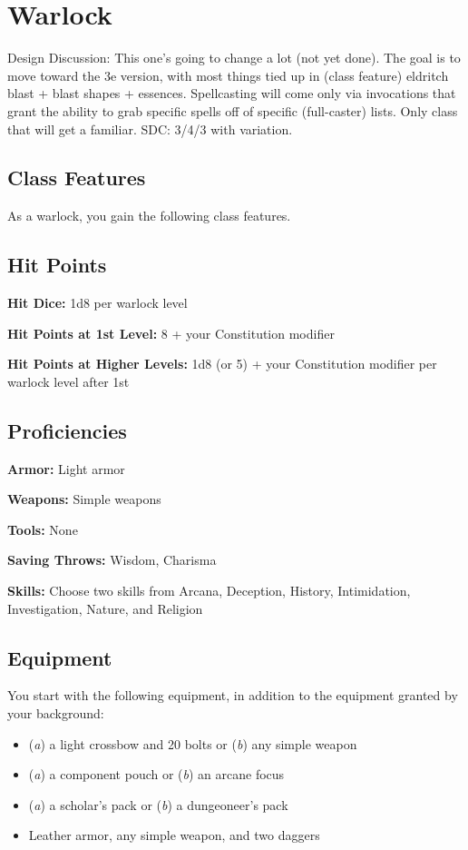 \section{Warlock}

Design Discussion: This one's going to change a lot (not yet done). The goal is to move toward the 3e version, with most things tied up in (class feature) eldritch blast + blast shapes + essences. Spellcasting will come only via invocations that grant the ability to grab specific spells off of specific (full-caster) lists. Only class that will get a familiar. SDC: 3/4/3 with variation.

\subsection{Class Features}

As a warlock, you gain the following class features.

\subsection{Hit Points}

\textbf{Hit Dice:} 1d8 per warlock level

\textbf{Hit Points at 1st Level:} 8 + your Constitution modifier

\textbf{Hit Points at Higher Levels:} 1d8 (or 5) + your Constitution modifier per warlock level after 1st

\subsection{Proficiencies}

\textbf{Armor:} Light armor

\textbf{Weapons:} Simple weapons

\textbf{Tools:} None

\textbf{Saving Throws:} Wisdom, Charisma

\textbf{Skills:} Choose two skills from Arcana, Deception, History, Intimidation, Investigation, Nature, and Religion

\subsection{Equipment}

You start with the following equipment, in addition to the equipment granted by your background:
\begin{itemize}
\item (\textit{a}) a light crossbow and 20 bolts or (\textit{b}) any simple weapon
\item (\textit{a}) a component pouch or (\textit{b}) an arcane focus
\item (\textit{a}) a scholar's pack or (\textit{b}) a dungeoneer's pack
\item Leather armor, any simple weapon, and two daggers
\end{itemize}

